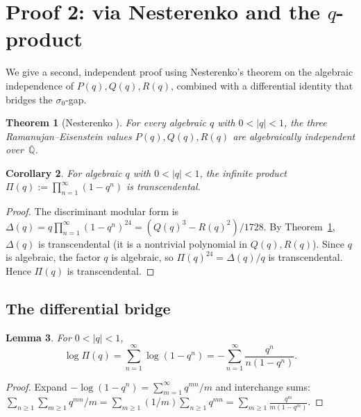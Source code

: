 \documentclass[12pt]{amsart}
\newtheorem{theorem}{Theorem}
\newtheorem{lemma}[theorem]{Lemma}
\newtheorem{corollary}[theorem]{Corollary}
\theoremstyle{definition}
\theoremstyle{remark}
\begin{document}
\section{Proof 2: via Nesterenko and the $q$-product}
\label{sec:nesterenko}

We give a second, independent proof using Nesterenko's theorem on
the algebraic independence of $P(q),Q(q),R(q)$, combined with a
differential identity that bridges the $\sigma_0$-gap.

\begin{theorem}[Nesterenko {\cite{nesterenko}}]\label{thm:nest}
For every algebraic $q$ with $0<|q|<1$, the three Ramanujan--Eisenstein
values $P(q),Q(q),R(q)$ are algebraically independent
over~$\overline{\mathbb{Q}}$.
\end{theorem}

\begin{corollary}\label{cor:prod}
For algebraic $q$ with $0<|q|<1$, the infinite product
$\Pi(q):=\prod_{n=1}^{\infty}(1-q^n)$
is transcendental.
\end{corollary}
\begin{proof}
The discriminant modular form is
$\Delta(q)=q\prod_{n=1}^{\infty}(1-q^n)^{24}=(Q(q)^3-R(q)^2)/1728$.
By Theorem~\ref{thm:nest}, $\Delta(q)$ is transcendental (it is a
nontrivial polynomial in $Q(q),R(q)$). Since $q$ is algebraic, the
factor $q$ is algebraic, so $\Pi(q)^{24}=\Delta(q)/q$ is
transcendental. Hence $\Pi(q)$ is transcendental.
\end{proof}

\subsection{The differential bridge}

\begin{lemma}\label{lem:logprod}
For $0<|q|<1$,
\begin{equation}\label{eq:logprod}
  \log\Pi(q) = \sum_{n=1}^{\infty}\log(1-q^n)
             = -\sum_{n=1}^{\infty}\frac{q^n}{n(1-q^n)}.
\end{equation}
\end{lemma}
\begin{proof}
Expand $-\log(1-q^n)=\sum_{m=1}^{\infty}q^{mn}/m$ and interchange
sums: $\sum_{n\ge 1}\sum_{m\ge 1}q^{mn}/m
=\sum_{m\ge 1}(1/m)\sum_{n\ge 1}q^{mn}
=\sum_{m\ge 1}\frac{q^m}{m(1-q^m)}$.
\end{proof}
\end{document}
